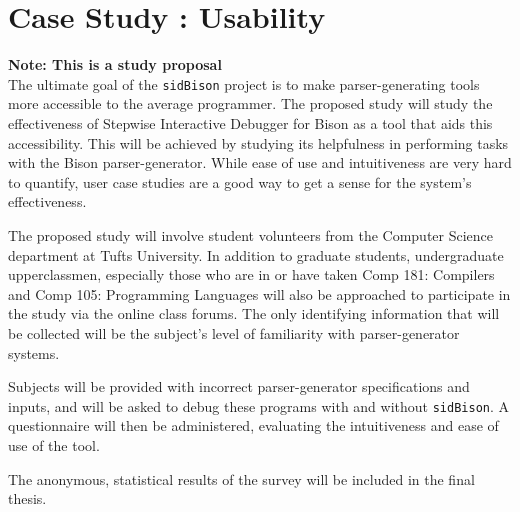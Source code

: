 \chapter{Case Study : Usability}

\textbf{Note: This is a study proposal}\\

The ultimate goal of the \verb|sidBison| project is to make parser-generating tools more accessible to the average programmer. The proposed study will study the effectiveness of Stepwise Interactive Debugger for Bison as a tool that aids this accessibility. This will be achieved by studying its helpfulness in performing tasks with the Bison parser-generator. While ease of use and intuitiveness are very hard to quantify, user case studies are a good way to get a sense for the system's effectiveness.

The proposed  study will involve student volunteers from the Computer Science department at Tufts University. In addition to graduate students, undergraduate upperclassmen, especially those who are in or have taken Comp 181: Compilers and Comp 105: Programming Languages will also be approached to participate in the study via the online class forums. The only identifying information that will be collected will be the subject's level of familiarity with parser-generator systems.

Subjects will be provided with incorrect parser-generator specifications and inputs, and will be asked to debug these programs with and without \verb|sidBison|.  A questionnaire will then be administered, evaluating the intuitiveness and ease of use of the tool. 

The anonymous, statistical results of the survey will be included in the final thesis.


